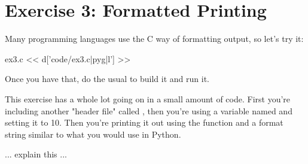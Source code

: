 \chapter{Exercise 3: Formatted Printing}

Many programming languages use the C way of formatting output, so let's try it:

\begin{code}{ex3.c}
<< d['code/ex3.c|pyg|l'] >>
\end{code}

Once you have that, do the usual  to build it and run it.

This exercise has a whole lot going on in a small amount of code.  First you're
including another "header file" called , then you're using a variable 
named  and setting it to 10.  Then you're printing it out using the
function  and a format string similar to what you would use
in Python.

... explain this ...

